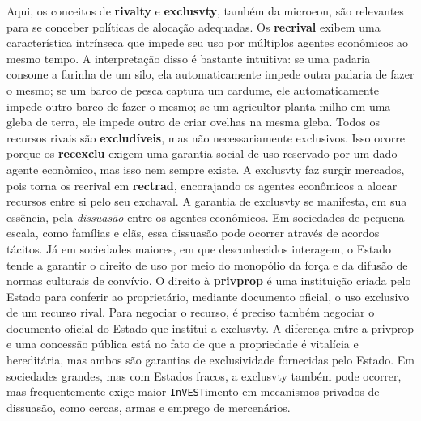\documentclass[./main.tex]{subfiles}
\begin{document}
\par Aqui, os conceitos de \textbf{\gls{rivalty}} e \textbf{\gls{exclusvty}}, também da \gls{microeon}, são relevantes para se conceber políticas de alocação adequadas. Os \textbf{\gls{recrival}} exibem uma característica intrínseca que impede seu uso por múltiplos agentes econômicos ao mesmo tempo. A interpretação disso é bastante intuitiva: se uma padaria consome a farinha de um silo, ela automaticamente impede outra padaria de fazer o mesmo; se um barco de pesca captura um cardume, ele automaticamente impede outro barco de fazer o mesmo; se um agricultor planta milho em uma gleba de terra, ele impede outro de criar ovelhas na mesma gleba. Todos os recursos rivais são \textbf{excludíveis}, mas não necessariamente exclusivos. Isso ocorre porque os \textbf{\gls{recexclu}} exigem uma garantia social de uso reservado por um dado agente econômico, mas isso nem sempre existe. A \gls{exclusvty} faz surgir mercados, pois torna os \gls{recrival} em \textbf{\gls{rectrad}}, encorajando os agentes econômicos a alocar recursos entre si pelo seu \gls{exchaval}. A garantia de \gls{exclusvty} se manifesta, em sua essência, pela \textit{dissuasão} entre os agentes econômicos. Em sociedades de pequena escala, como famílias e clãs, essa dissuasão pode ocorrer através de acordos tácitos. Já em sociedades maiores, em que desconhecidos interagem, o Estado tende a garantir o direito de uso por meio do monopólio da força e da difusão de normas culturais de convívio. O direito à \textbf{\gls{privprop}} é uma instituição criada pelo Estado para conferir ao proprietário, mediante documento oficial, o uso exclusivo de um recurso rival. Para negociar o recurso, é preciso também negociar o documento oficial do Estado que institui a \gls{exclusvty}. A diferença entre a \gls{privprop} e uma concessão pública está no fato de que a propriedade é vitalícia e hereditária, mas ambos são garantias de exclusividade fornecidas pelo Estado. Em sociedades grandes, mas com Estados fracos, a \gls{exclusvty} também pode ocorrer, mas frequentemente exige maior \texttt{InVEST}imento em mecanismos privados de dissuasão, como cercas, armas e emprego de mercenários.
\end{document}
